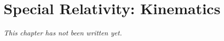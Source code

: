 \chapter{Special Relativity: Kinematics}\label{ch:b3:relativistic-kinematics}


\emph{This chapter has not been written yet.}
